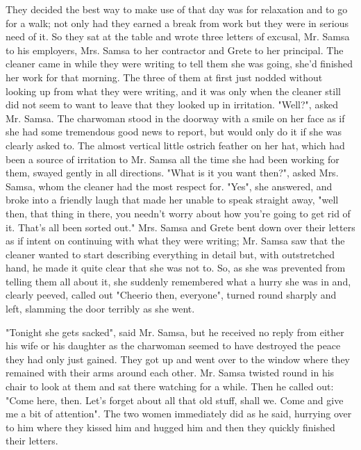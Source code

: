 They decided the best way to make use of that day was for relaxation and to go for a walk; not only had they earned a break from work but they were in serious need of it. So they sat at the table and wrote three letters of excusal, Mr. Samsa to his employers, Mrs. Samsa to her contractor and Grete to her principal. The cleaner came in while they were writing to tell them she was going, she'd finished her work for that morning. The three of them at first just nodded without looking up from what they were writing, and it was only when the cleaner still did not seem to want to leave that they looked up in irritation. "Well?", asked Mr. Samsa. The charwoman stood in the doorway with a smile on her face as if she had some tremendous good news to report, but would only do it if she was clearly asked to. The almost vertical little ostrich feather on her hat, which had been a source of irritation to Mr. Samsa all the time she had been working for them, swayed gently in all directions. "What is it you want then?", asked Mrs. Samsa, whom the cleaner had the most respect for. "Yes", she answered, and broke into a friendly laugh that made her unable to speak straight away, "well then, that thing in there, you needn't worry about how you're going to get rid of it. That's all been sorted out."   Mrs. Samsa and Grete bent down over their letters as if intent on continuing with what they were writing; Mr. Samsa saw that the cleaner wanted to start describing everything in detail but, with outstretched hand, he made it quite clear that she was not to. So, as she was prevented from telling them all about it, she suddenly remembered what a hurry she was in and, clearly peeved, called out "Cheerio then, everyone", turned round sharply and left, slamming the door terribly as she went.

"Tonight she gets sacked", said Mr. Samsa, but he received no reply from either his wife or his daughter as the charwoman seemed to have destroyed the peace they had only just gained. They got up and went over to the window where they remained with their arms around each other. Mr. Samsa twisted round in his chair to look at them and sat there watching for a while. Then he called out: "Come here, then. Let's forget about all that old stuff, shall we. Come and give me a bit of attention". The two women immediately did as he said, hurrying over to him where they kissed him and hugged him and then they quickly finished their letters.

